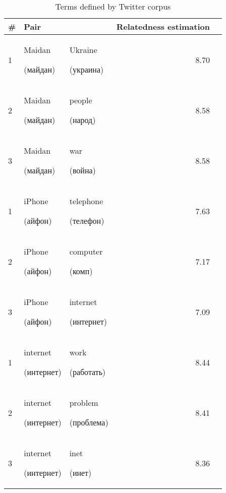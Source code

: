 \documentclass[11pt,letterpaper]{article}
\begin{document}
\begin{table*}[t]
\begin{center}
\begin{tabular}{|l|ll|r|r|}
\hline \bf \# & \bf Pair &  & Relatedness estimation  \\ \hline
1 & Maidan  \begin{russian}(майдан)\end{russian} & Ukraine \begin{russian}(украина)  \end{russian} & 8.70  \\
2 & Maidan  \begin{russian}(майдан)\end{russian} & people  \begin{russian}(народ)    \end{russian} & 8.58 \\
3 & Maidan  \begin{russian}(майдан)\end{russian} & war     \begin{russian}(война)    \end{russian} & 8.58 \\
\hline
1 & iPhone  \begin{russian}(айфон)\end{russian} & telephone \begin{russian}(телефон)\end{russian} & 7.63 \\
2 & iPhone  \begin{russian}(айфон)\end{russian} & computer \begin{russian}(комп)\end{russian} & 7.17 \\
3 & iPhone  \begin{russian}(айфон)\end{russian} & internet \begin{russian}(интернет)\end{russian} & 7.09 \\
\hline
1 & internet  \begin{russian}(интернет)\end{russian} & work \begin{russian}(работать)\end{russian} & 8.44 \\
2 & internet  \begin{russian}(интернет)\end{russian} & problem \begin{russian}(проблема)\end{russian} & 8.41 \\
3 & internet  \begin{russian}(интернет)\end{russian} & inet \begin{russian}(инет)\end{russian} & 8.36 \\
\hline
\end{tabular}
\end{center}
\caption{\label{discovered-table} Terms defined by Twitter corpus }
\end{table*}
\end{document}
